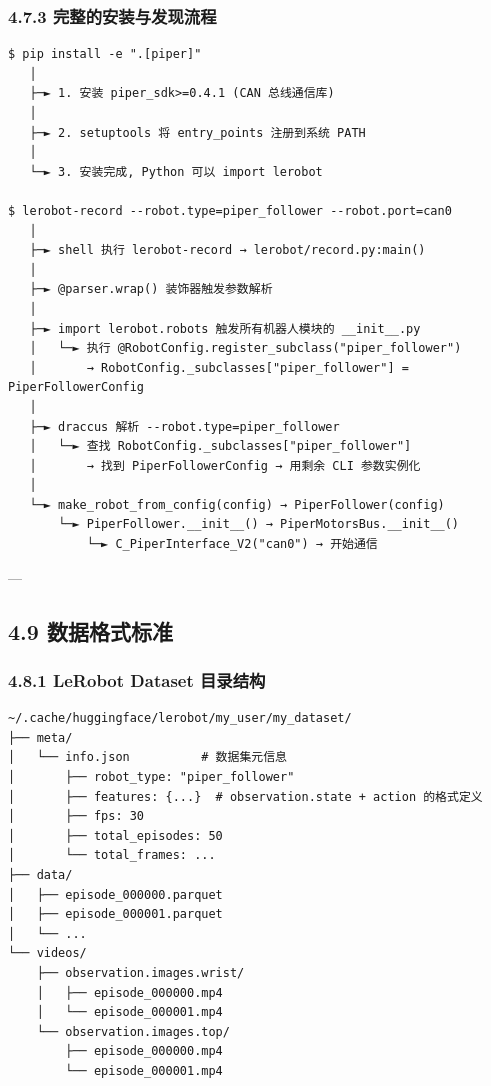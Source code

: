 \documentclass[UTF8,a4paper,11pt]{ctexart}
\begin{document}
\subsubsection{4.7.3 完整的安装与发现流程}

\begin{lstlisting}[language=text]
$ pip install -e ".[piper]"
   │
   ├─► 1. 安装 piper_sdk>=0.4.1 (CAN 总线通信库)
   │
   ├─► 2. setuptools 将 entry_points 注册到系统 PATH
   │
   └─► 3. 安装完成, Python 可以 import lerobot

$ lerobot-record --robot.type=piper_follower --robot.port=can0
   │
   ├─► shell 执行 lerobot-record → lerobot/record.py:main()
   │
   ├─► @parser.wrap() 装饰器触发参数解析
   │
   ├─► import lerobot.robots 触发所有机器人模块的 __init__.py
   │   └─► 执行 @RobotConfig.register_subclass("piper_follower")
   │       → RobotConfig._subclasses["piper_follower"] = PiperFollowerConfig
   │
   ├─► draccus 解析 --robot.type=piper_follower
   │   └─► 查找 RobotConfig._subclasses["piper_follower"]
   │       → 找到 PiperFollowerConfig → 用剩余 CLI 参数实例化
   │
   └─► make_robot_from_config(config) → PiperFollower(config)
       └─► PiperFollower.__init__() → PiperMotorsBus.__init__()
           └─► C_PiperInterface_V2("can0") → 开始通信
\end{lstlisting}

---

\subsection{4.9 数据格式标准}

\subsubsection{4.8.1 LeRobot Dataset 目录结构}

\begin{lstlisting}[language=text]
~/.cache/huggingface/lerobot/my_user/my_dataset/
├── meta/
│   └── info.json          # 数据集元信息
│       ├── robot_type: "piper_follower"
│       ├── features: {...}  # observation.state + action 的格式定义
│       ├── fps: 30
│       ├── total_episodes: 50
│       └── total_frames: ...
├── data/
│   ├── episode_000000.parquet
│   ├── episode_000001.parquet
│   └── ...
└── videos/
    ├── observation.images.wrist/
    │   ├── episode_000000.mp4
    │   └── episode_000001.mp4
    └── observation.images.top/
        ├── episode_000000.mp4
        └── episode_000001.mp4
\end{lstlisting}
\end{document}

